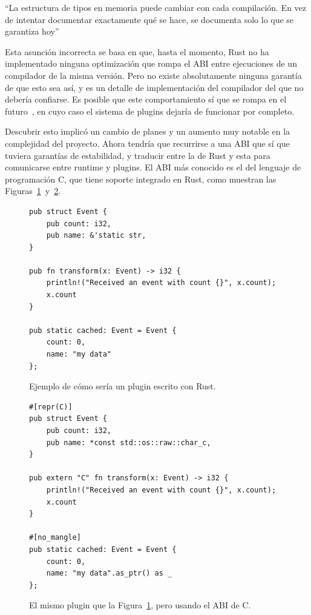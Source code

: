 ``La estructura de tipos en memoria puede cambiar con cada compilación. En vez
de intentar documentar exactamente qué se hace, se documenta solo lo que se
garantiza hoy''~\cite[Type Layout]{rustref}

Esta asunción incorrecta se basa en que, hasta el momento, Rust no ha
implementado ninguna optimización que rompa el ABI entre ejecuciones de un
compilador de la misma versión. Pero no existe absolutamente ninguna garantía de
que esto sea así, y es un detalle de implementación del compilador del que no
debería confiarse. Es posible que este comportamiento sí que se rompa en el
futuro~\cite{randomizelayout}, en cuyo caso el sistema de plugins dejaría de
funcionar por completo.

Descubrir esto implicó un cambio de planes y un aumento muy notable en la
complejidad del proyecto. Ahora tendría que recurrirse a una ABI que sí que
tuviera garantías de estabilidad, y traducir entre la de Rust y esta para
comunicarse entre runtime y plugins. El ABI más conocido es el del lenguaje de
programación C, que tiene soporte integrado en Rust, como muestran las
Figuras~\ref{fig:rustpure}~y~\ref{fig:rustffi}.

\begin{figure}
    \centering
    \begin{verbatim}
pub struct Event {
    pub count: i32,
    pub name: &'static str,
}

pub fn transform(x: Event) -> i32 {
    println!("Received an event with count {}", x.count);
    x.count
}

pub static cached: Event = Event {
    count: 0,
    name: "my data"
};
    \end{verbatim}

    \caption{Ejemplo de cómo sería un plugin escrito con Rust.}%
    \label{fig:rustpure}
\end{figure}

\begin{figure}
    \centering
    \begin{verbatim}
#[repr(C)]
pub struct Event {
    pub count: i32,
    pub name: *const std::os::raw::char_c,
}

pub extern "C" fn transform(x: Event) -> i32 {
    println!("Received an event with count {}", x.count);
    x.count
}

#[no_mangle]
pub static cached: Event = Event {
    count: 0,
    name: "my data".as_ptr() as _
};
    \end{verbatim}

    \caption{El mismo plugin que la Figura~\ref{fig:rustpure}, pero usando el
    ABI de C.}%
    \label{fig:rustffi}
\end{figure}

